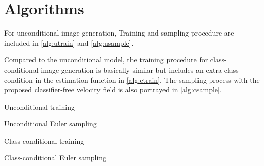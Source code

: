\documentclass{article}
\theoremstyle{plain}
\theoremstyle{definition}
\theoremstyle{remark}
\begin{document}
\section{Algorithms}
For unconditional image generation, Training and sampling procedure are included in \cref{alg:utrain} and \cref{alg:usample}. 

Compared to the unconditional model, the training procedure for class-conditional image generation is basically similar but includes an extra class condition in the estimation function  in \cref{alg:ctrain}. The sampling process with the proposed classifier-free 
velocity field is also portrayed in \cref{alg:csample}.

\begin{minipage}[t]{0.48\textwidth}
    \begin{algorithm}[H]
\caption{Unconditional training}\label{alg:utrain}
\;
\end{algorithm}
\end{minipage}
\hfill
\begin{minipage}[t]{0.5\textwidth}
    \begin{algorithm}[H]
\caption{Unconditional Euler sampling}\label{alg:usample}
\;
\;
\For{ \KwTo }{
    
}
\;
\kwOutput{}\;
\end{algorithm}
\end{minipage}

\begin{minipage}[t]{0.48\textwidth}
    \begin{algorithm}[H]
\caption{Class-conditional training}\label{alg:ctrain}
\;
\end{algorithm}
\end{minipage}
\hfill
\begin{minipage}[t]{0.5\textwidth}
    \begin{algorithm}[H]
\caption{Class-conditional Euler sampling}\label{alg:csample}
\;
\;
\For{ \KwTo }{
    \;
    \;
    
    
}
\;
\kwOutput{}\;
\end{algorithm}
\end{minipage}
 
\end{document}
